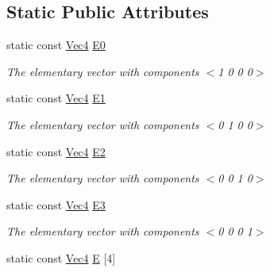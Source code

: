 \subsection*{Static Public Attributes}
\begin{DoxyCompactItemize}
\item 
\hypertarget{structgfxmath_1_1_vec4_abac7a7c5dc05d203efd0b25e4be24103}{}static const \hyperlink{structgfxmath_1_1_vec4}{Vec4} \hyperlink{structgfxmath_1_1_vec4_abac7a7c5dc05d203efd0b25e4be24103}{E0}\label{structgfxmath_1_1_vec4_abac7a7c5dc05d203efd0b25e4be24103}

\begin{DoxyCompactList}\small\item\em The elementary vector with components $<$1 0 0 0$>$ \end{DoxyCompactList}\item 
\hypertarget{structgfxmath_1_1_vec4_af68241e60c037d16fde0793a700033d6}{}static const \hyperlink{structgfxmath_1_1_vec4}{Vec4} \hyperlink{structgfxmath_1_1_vec4_af68241e60c037d16fde0793a700033d6}{E1}\label{structgfxmath_1_1_vec4_af68241e60c037d16fde0793a700033d6}

\begin{DoxyCompactList}\small\item\em The elementary vector with components $<$0 1 0 0$>$ \end{DoxyCompactList}\item 
\hypertarget{structgfxmath_1_1_vec4_a4b1810b7a1acd8c14034c444fcede64f}{}static const \hyperlink{structgfxmath_1_1_vec4}{Vec4} \hyperlink{structgfxmath_1_1_vec4_a4b1810b7a1acd8c14034c444fcede64f}{E2}\label{structgfxmath_1_1_vec4_a4b1810b7a1acd8c14034c444fcede64f}

\begin{DoxyCompactList}\small\item\em The elementary vector with components $<$0 0 1 0$>$ \end{DoxyCompactList}\item 
\hypertarget{structgfxmath_1_1_vec4_a642c1ba01570d0725b992f6109588a99}{}static const \hyperlink{structgfxmath_1_1_vec4}{Vec4} \hyperlink{structgfxmath_1_1_vec4_a642c1ba01570d0725b992f6109588a99}{E3}\label{structgfxmath_1_1_vec4_a642c1ba01570d0725b992f6109588a99}

\begin{DoxyCompactList}\small\item\em The elementary vector with components $<$0 0 0 1$>$ \end{DoxyCompactList}\item 
\hypertarget{structgfxmath_1_1_vec4_aa2a0b9df9b07e6c8a0cf9d0783447e9c}{}static const \hyperlink{structgfxmath_1_1_vec4}{Vec4} \hyperlink{structgfxmath_1_1_vec4_aa2a0b9df9b07e6c8a0cf9d0783447e9c}{E} \mbox{[}4\mbox{]}\label{structgfxmath_1_1_vec4_aa2a0b9df9b07e6c8a0cf9d0783447e9c}


\end{DoxyCompactItemize}
